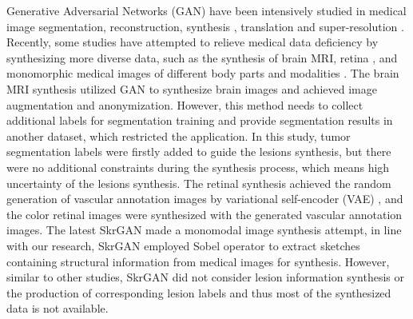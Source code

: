 \documentclass[runningheads]{llncs}
\begin{document}
	Generative Adversarial Networks (GAN) have been intensively studied in medical image segmentation\cite{40kamnitsas2017unsupervised}, reconstruction\cite{61fan2018a}, synthesis \cite{41costa2017towards,4shin2018medical,43iglesias2013is,44shrivastava2017learning}, translation \cite{2zhang2018translating,20nie2017medical,35osokin2017gans,36vannguyen2015crossdomain,40kamnitsas2017unsupervised,136yi2018sharpness-aware,137yang2018low-dose,138WolterinkGenerative} and super-resolution \cite{14You2018CT}.
	Recently, some studies have attempted to relieve medical data deficiency by synthesizing more diverse data, such as the synthesis of brain MRI\cite{4shin2018medical}, retina \cite{41costa2017towards}, and monomorphic medical images of different body parts and modalities \cite{96zhang2019skrgan:}. The brain MRI synthesis \cite{4shin2018medical} utilized GAN to synthesize brain images and achieved image augmentation and anonymization. However, this method needs to collect additional labels for segmentation training and provide segmentation results in another dataset, which restricted the application. In this study, tumor segmentation labels were firstly added to guide the lesions synthesis, but there were no additional constraints during the synthesis process, which means high uncertainty of the lesions synthesis. The retinal synthesis \cite{41costa2017towards} achieved the random generation of vascular annotation images by variational self-encoder (VAE) \cite{88rezende2014stochastic}, and the color retinal images were synthesized with the generated vascular annotation images. The latest SkrGAN\cite{96zhang2019skrgan:} made a monomodal image synthesis attempt, in line with our research, SkrGAN employed Sobel operator to extract sketches containing structural information from medical images for synthesis. However, similar to other studies, SkrGAN did not consider lesion information synthesis or the production of corresponding lesion labels and thus most of the synthesized data is not available.
	
\end{document}
